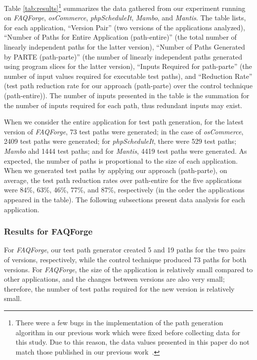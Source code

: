 Table \ref{tab:results}\footnote{There were
a few bugs in the implementation of the path generation algorithm
in our previous work which were fixed before collecting data
for this study. Due to this reason, the data values presented
in this paper do not match those published in our previous
work~\cite{marback12}.} summarizes the data gathered from
our experiment running on {\em FAQForge}, {\em osCommerce},
{\em phpScheduleIt}, {\em Mambo}, and {\em Mantis}.
The table lists, for each application, ``Version Pair''
(two versions of the applications analyzed), ``Number of Paths
for Entire Application (path-entire)'' (the total number of 
linearly independent paths for the latter version), ``Number 
of Paths Generated by PARTE (path-parte)'' (the number of 
linearly independent paths generated using program slices 
for the latter version), ``Inputs Required for path-parte'' 
(the number of input values required for executable test paths),
and ``Reduction Rate'' (test path reduction rate for our approach
(path-parte) over the control technique (path-entire)). 
The number of inputs presented in the table is the summation for
the number of inputs required for each path, thus redundant inputs 
may exist. 

When we consider the entire application for test path generation,
for the latest version of {\em FAQForge}, 73 test paths were 
generated; in the case of {\em osCommerce}, 2409 test paths 
were generated; for {\em phpScheduleIt}, there were 529 test paths; 
{\em Mambo} ahd 1444 test paths; and for {\em Mantis}, 4419 test 
paths were generated. As expected, the number of paths is proportional 
to the size of each application. When we generated test paths by 
applying our approach (path-parte), on average, the test path 
reduction rates over path-entire for the five applications were 
84\%, 63\%, 46\%, 77\%, and 87\%, respectively (in the 
order the applications appeared in the table). 
The following subsections present data analysis for each application.
 
\subsubsection{Results for FAQForge}

For {\em FAQForge}, our test path generator created 5 and 19 
paths for the two pairs of versions, respectively, while the control
technique produced 73 paths for both versions. 
For {\em FAQForge}, the size of the application is relatively small 
compared to other applications, and the changes between versions 
are also very small; therefore, the number of test paths required 
for the new version is relatively small.

